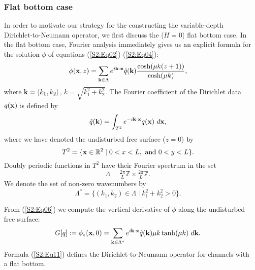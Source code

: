\subsubsection{Flat bottom case}
In order to motivate our strategy for the constructing the variable-depth Dirichlet-to-Neumann operator, 
we first discuss the ($H=0$) flat bottom case. 
In the flat bottom case, Fourier analysis immediately gives us an explicit formula for the solution $\phi$ of equations (\ref{S2:Eq02})-(\ref{S2:Eq04}):
\begin{equation}\label{S2:Eq06}
\phi(\bold{x},z) = \sum_{\bold{k}\in\Lambda}e^{i\bold{k}\cdot\bold{x}}\hat{q}(\bold{k})\frac{\cosh(\mu k(z+1))}{\cosh(\mu k)},
\end{equation}
where $\bold{k} = (k_1,k_2)$, $k=\sqrt{k_1^2+k_2^2}$. 
The Fourier coefficient of the Dirichlet data $q(\bold{x})$ is
defined by
\begin{equation}\label{S2:Eq07}
\hat{q}(\bold{k}) = \int_{T^2}e^{-i\bold{k}\cdot\bold{x}}q(\bold{x})\ d\bold{x},
\end{equation}
where we have denoted the undisturbed free surface ($z=0$) by 
\begin{equation}\label{S2:Eq08}
T^2 = \{\bold{x}\in\mathbb{R}^2 \mid 0 <x< L,\ \text{and\ } 0 <y<L \}.
\end{equation}
Doubly periodic functions in $T^2$ have their Fourier spectrum in the set
\begin{equation}\label{S2:Eq09}
\Lambda = \tfrac{2\pi}{L}\mathbb{Z}\times\tfrac{2\pi}{L}\mathbb{Z}.
\end{equation}
We denote the set of non-zero wavenumbers by 
\begin{equation}\label{S2:Eq10}
\Lambda^* = \{ (k_1,k_2)\in\Lambda \mid k_1^2 + k^2_2 > 0\}.
\end{equation}


From (\ref{S2:Eq06}) we  compute the vertical derivative of $\phi$ along the undisturbed free surface:
\begin{equation}\label{S2:Eq11}
G[q] := \phi_z(\x,0) = \sum_{\ka\in\Lambda^*}e^{i\ka\cdot\x}\hat{q}(\ka)\mu k\tanh(\mu k)\ d\ka.
\end{equation}
Formula (\ref{S2:Eq11}) defines the Dirichlet-to-Neumann operator for channels with a flat bottom. 
